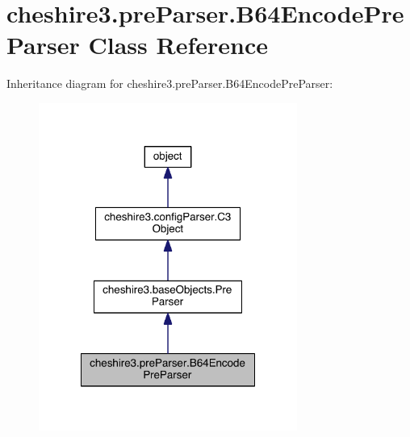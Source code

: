 \hypertarget{classcheshire3_1_1pre_parser_1_1_b64_encode_pre_parser}{\section{cheshire3.\-pre\-Parser.\-B64\-Encode\-Pre\-Parser Class Reference}
\label{classcheshire3_1_1pre_parser_1_1_b64_encode_pre_parser}
}


Inheritance diagram for cheshire3.\-pre\-Parser.\-B64\-Encode\-Pre\-Parser\-:
\nopagebreak
\begin{figure}[H]
\begin{center}
\leavevmode
\includegraphics[width=240pt]{classcheshire3_1_1pre_parser_1_1_b64_encode_pre_parser__inherit__graph}
\end{center}
\end{figure}



